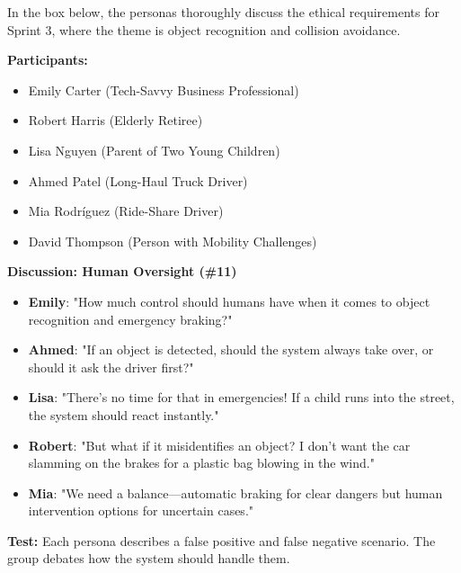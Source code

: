In %
the box below, the personas thoroughly discuss the ethical requirements for Sprint 3, where the theme is object recognition and collision avoidance.

\begin{tcolorbox}
  [breakable, colback=black!5!white,colframe=black!50!white, title={Sprint 3: Object Recognition \& Collision Avoidance - Ethical Discussion}]
  
  \textbf{Participants:}
  
  \begin{itemize}
      \item Emily Carter (Tech-Savvy Business Professional)
      \item Robert Harris (Elderly Retiree)
      \item Lisa Nguyen (Parent of Two Young Children)
      \item Ahmed Patel (Long-Haul Truck Driver)
      \item Mia Rodríguez (Ride-Share Driver)
      \item David Thompson (Person with Mobility Challenges)
  \end{itemize}
  
  \textbf{Discussion: Human Oversight (\#11)}
  
  \begin{itemize}
      \item \textbf{Emily}: "How much control should humans have when it comes to object recognition and emergency braking?"
      \item \textbf{Ahmed}: "If an object is detected, should the system always take over, or should it ask the driver first?"
      \item \textbf{Lisa}: "There’s no time for that in emergencies! If a child runs into the street, the system should react instantly."
      \item \textbf{Robert}: "But what if it misidentifies an object? I don’t want the car slamming on the brakes for a plastic bag blowing in the wind."
      \item \textbf{Mia}: "We need a balance—automatic braking for clear dangers but human intervention options for uncertain cases."
  \end{itemize}
  
  \textbf{Test:} Each persona describes a false positive and false negative scenario. The group debates how the system should handle them.
  

\end{tcolorbox}
